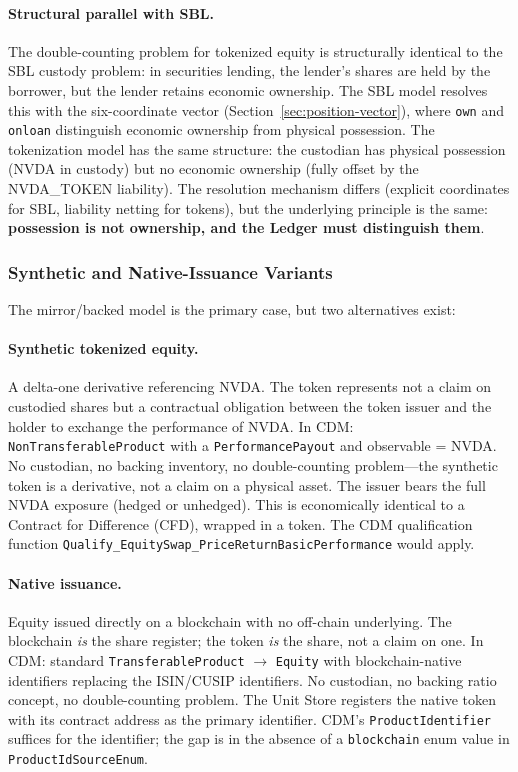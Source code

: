 \documentclass[11pt,a4paper]{article}
\begin{document}
\paragraph{Structural parallel with SBL.} The double-counting problem for tokenized equity is structurally identical to the SBL custody problem: in securities lending, the lender's shares are held by the borrower, but the lender retains economic ownership. The SBL model resolves this with the six-coordinate vector (Section~\ref{sec:position-vector}), where \texttt{own} and \texttt{onloan} distinguish economic ownership from physical possession. The tokenization model has the same structure: the custodian has physical possession (NVDA in custody) but no economic ownership (fully offset by the NVDA\_TOKEN liability). The resolution mechanism differs (explicit coordinates for SBL, liability netting for tokens), but the underlying principle is the same: \textbf{possession is not ownership, and the Ledger must distinguish them}.

\subsubsection{Synthetic and Native-Issuance Variants}
\label{sec:cdm-tokenized-variants}

The mirror/backed model is the primary case, but two alternatives exist:

\paragraph{Synthetic tokenized equity.} A delta-one derivative referencing NVDA. The token represents not a claim on custodied shares but a contractual obligation between the token issuer and the holder to exchange the performance of NVDA. In CDM: \texttt{NonTransferableProduct} with a \texttt{PerformancePayout} and observable = NVDA. No custodian, no backing inventory, no double-counting problem---the synthetic token is a derivative, not a claim on a physical asset. The issuer bears the full NVDA exposure (hedged or unhedged). This is economically identical to a Contract for Difference (CFD), wrapped in a token. The CDM qualification function \texttt{Qualify\_EquitySwap\_PriceReturnBasicPerformance} would apply.

\paragraph{Native issuance.} Equity issued directly on a blockchain with no off-chain underlying. The blockchain \emph{is} the share register; the token \emph{is} the share, not a claim on one. In CDM: standard \texttt{TransferableProduct} $\to$ \texttt{Equity} with blockchain-native identifiers replacing the ISIN/CUSIP identifiers. No custodian, no backing ratio concept, no double-counting problem. The Unit Store registers the native token with its contract address as the primary identifier. CDM's \texttt{ProductIdentifier} suffices for the identifier; the gap is in the absence of a \texttt{blockchain} enum value in \texttt{ProductIdSourceEnum}.
\end{document}
